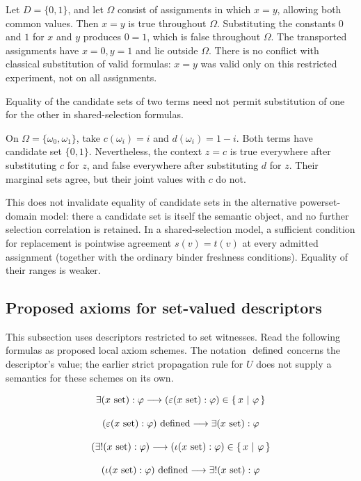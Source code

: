 \begin{example}
Let $D=\{0,1\}$, and let $\Omega$ consist of assignments in which
$x=y$, allowing both common values. Then $x=y$ is true throughout
$\Omega$. Substituting the constants $0$ and $1$ for $x$ and $y$
produces $0=1$, which is false throughout $\Omega$. The transported
assignments have $x=0,y=1$ and lie outside $\Omega$.
There is no conflict with classical substitution of valid formulas:
$x=y$ was valid only on this restricted experiment, not on all assignments.
\end{example}

\begin{proposition}
Equality of the candidate sets of two terms need not permit substitution
of one for the other in shared-selection formulas.
\end{proposition}
\Proof
On $\Omega=\{\omega_0,\omega_1\}$, take $c(\omega_i)=i$ and
$d(\omega_i)=1-i$. Both terms have candidate set $\{0,1\}$.
Nevertheless, the context $z=c$ is true everywhere after substituting
$c$ for $z$, and false everywhere after substituting $d$ for $z$.
Their marginal sets agree, but their joint values with $c$ do not.
\Done

This does not invalidate equality of candidate sets in the alternative
powerset-domain model: there a candidate set is itself the semantic object,
and no further selection correlation is retained. In a shared-selection
model, a sufficient condition for replacement is pointwise agreement
$s(v)=t(v)$ at every admitted assignment (together with the ordinary
binder freshness conditions). Equality of their ranges is weaker.

\subsection{Proposed axioms for set-valued descriptors}
This subsection uses descriptors restricted to set witnesses. Read the
following formulas as proposed local axiom schemes. The notation
$\mathrm{\ defined}$ concerns the descriptor's value; the earlier strict propagation
rule for $U$ does not supply a semantics for these schemes on its own.

\begin{axiom}
\[
\exists (x\mathrm{\ set}):\varphi
\longrightarrow
(\varepsilon (x\mathrm{\ set}): \varphi) \in \left\{\,x\ \middle|\ \varphi\,\right\}
\]
\end{axiom}
\begin{axiom}
\[
(\varepsilon (x\mathrm{\ set}): \varphi) \mathrm{\ defined}
\longrightarrow
\exists (x\mathrm{\ set}):\varphi
\]
\end{axiom}
\begin{axiom}
\[
(\exists! (x\mathrm{\ set}):\varphi)
\longrightarrow
(\iota (x\mathrm{\ set}): \varphi) \in \left\{\,x\ \middle|\ \varphi\,\right\}
\]
\end{axiom}
\begin{axiom}
\[
(\iota (x\mathrm{\ set}): \varphi) \mathrm{\ defined}
\longrightarrow
\exists! (x\mathrm{\ set}):\varphi
\]
\end{axiom}

